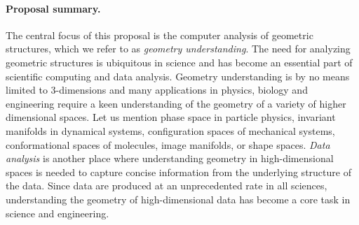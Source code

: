 \documentclass[a4paper, 11pt]{article}
\begin{document}
\paragraph{Proposal summary.} 
The central focus of this proposal is the computer analysis of
geometric structures, which we refer to as {\em geometry
  understanding}.  The need for analyzing geometric structures is
ubiquitous in science and has become an essential part of scientific
computing and data analysis. Geometry understanding is by no means
limited to 3-dimensions and many applications in physics, biology and
engineering require a keen understanding of the geometry of a variety
of higher dimensional spaces. Let us mention phase space in particle
physics, invariant manifolds in dynamical systems, configuration
spaces of mechanical systems, conformational spaces of molecules,
image manifolds, or shape spaces.
%
{\em Data analysis}  is another place where understanding
geometry in high-dimensional spaces is needed to
capture concise information from the underlying structure of the data.  %
Since data are produced at an unprecedented rate in all
sciences, understanding the geometry of high-dimensional data %
has become a core task in science and engineering.
\end{document}
